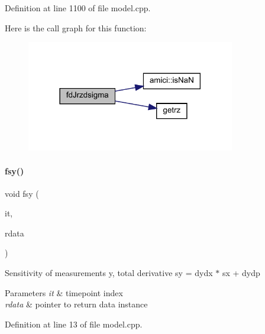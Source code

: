 Definition at line 1100 of file model.\+cpp.

Here is the call graph for this function\+:
\nopagebreak
\begin{figure}[H]
\begin{center}
\leavevmode
\includegraphics[width=258pt]{classamici_1_1_model_a3e6a11cdaa35b6e85d013eb9f63564d2_cgraph}
\end{center}
\end{figure}
\mbox{\label{classamici_1_1_model_a6b1c331013c5947e77129cb4da82713e}} 
\paragraph{\texorpdfstring{fsy()}{fsy()}}
{\footnotesize\ttfamily void fsy (\begin{DoxyParamCaption}\item[{const int}]{it,  }\item[{\mbox{\hyperlink{classamici_1_1_return_data}{Return\+Data}} $\ast$}]{rdata }\end{DoxyParamCaption})}

Sensitivity of measurements y, total derivative sy = dydx $\ast$ sx + dydp 
\begin{DoxyParams}{Parameters}
{\em it} & timepoint index \\
\hline
{\em rdata} & pointer to return data instance \\
\hline
\end{DoxyParams}


Definition at line 13 of file model.\+cpp.

